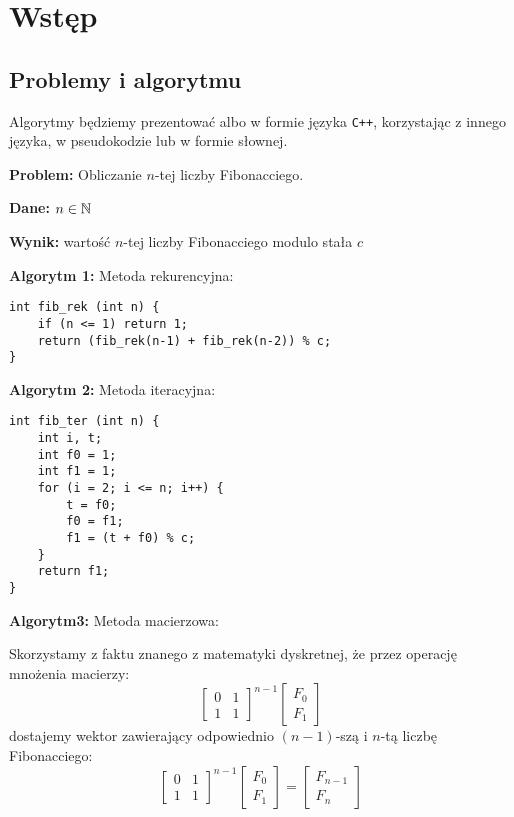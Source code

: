 \section{Wstęp}
\subsection{Problemy i algorytmu}

{Algorytmy będziemy prezentować albo w formie języka \verb_C++_, korzystając z innego języka, w pseudokodzie lub w formie słownej. }
\bigskip

\textbf{Problem:} Obliczanie $n$-tej liczby Fibonacciego.
\smallskip

\textbf{Dane:} $n\in\mathbb{N}$

\textbf{Wynik:} wartość $n$-tej liczby Fibonacciego modulo stała $c$

\textbf{Algorytm 1:} Metoda rekurencyjna:
\begin{lstlisting}
int fib_rek (int n) {
    if (n <= 1) return 1;
    return (fib_rek(n-1) + fib_rek(n-2)) % c;
}
\end{lstlisting}

\textbf{Algorytm 2:} Metoda iteracyjna:
\begin{lstlisting}
int fib_ter (int n) {
    int i, t;
    int f0 = 1;
    int f1 = 1;
    for (i = 2; i <= n; i++) {
        t = f0;
        f0 = f1;
        f1 = (t + f0) % c;
    }
    return f1;
}
\end{lstlisting}

\textbf{Algorytm3:} Metoda macierzowa:
\smallskip

Skorzystamy z faktu znanego z matematyki dyskretnej, że przez operację mnożenia macierzy:
$$\begin{bmatrix}
    0 & 1\\1&1
\end{bmatrix}^{n-1}\begin{bmatrix}
    F_0\\F_1
\end{bmatrix}$$
dostajemy wektor zawierający odpowiednio $(n-1)$-szą i $n$-tą liczbę Fibonacciego:
$$\begin{bmatrix}
    0 & 1\\1&1
\end{bmatrix}^{n-1}\begin{bmatrix}
    F_0\\F_1
\end{bmatrix}=\begin{bmatrix}
    F_{n-1}\\F_n
\end{bmatrix}$$

